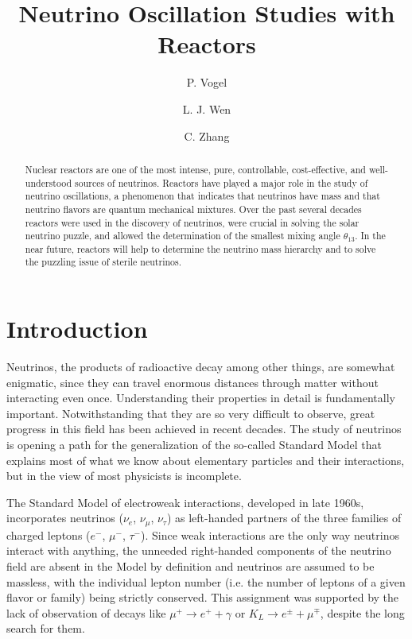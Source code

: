 \documentclass[aps,twocolumn,preprintnumbers,amsmath,superscriptaddress,amssymb,floats,nofootinbib]{revtex4-1}
\begin{document}
\title{Neutrino Oscillation Studies with Reactors}
\author{P. Vogel}
\author{L. J. Wen}
\author{C. Zhang}


\begin{abstract}
Nuclear reactors are one of the most intense, pure, controllable, cost-effective, and well-understood sources of neutrinos. Reactors have played a major 
role in the study of neutrino oscillations, a phenomenon that indicates that neutrinos have mass and that neutrino flavors are quantum mechanical mixtures. Over the past several decades reactors were used in the discovery of neutrinos, were crucial in solving the solar neutrino puzzle, and allowed the determination of the smallest mixing angle $\theta_{13}$. In the near future, reactors will help to determine the neutrino mass hierarchy and to solve the puzzling issue of sterile neutrinos.
\end{abstract}

\maketitle
\thispagestyle{plain}

\section{Introduction} 
\label{sec:intro}
Neutrinos, the products of  radioactive decay among other things, are somewhat enigmatic, since they can travel enormous distances through matter without interacting even once. 
Understanding their properties in detail is fundamentally important. Notwithstanding that they are so very difficult to observe, great progress in this field has been achieved in recent decades.   
The study of neutrinos is opening a path for the generalization of the so-called Standard Model that explains most of what we know 
about elementary particles and their interactions, but in the view of most physicists is incomplete.

The Standard Model of electroweak interactions,
developed in late 1960s, incorporates neutrinos ($\nu_e$, $\nu_\mu$, $\nu_\tau$) as left-handed partners of the three families of charged leptons ($e^-$, $\mu^-$, $\tau^-$). 
Since weak interactions are the only way neutrinos interact with anything, the unneeded right-handed components of the neutrino field are absent 
in the Model by definition and neutrinos are assumed to be massless, with the individual lepton number (i.e. the number of leptons of a
given flavor or family) being strictly conserved.
This assignment was supported by the lack of observation of decays like 
$\mu^+ \rightarrow e^+ + \gamma$ or $K_L \rightarrow e^{\pm} + \mu^{\mp}$,
despite the long search for them.
\end{document}

